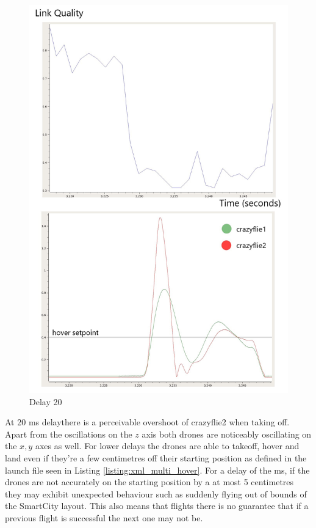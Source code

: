 \begin{figure}[H]
\centering
 \includegraphics[scale=0.35]{Figures/delay_20.jpg}
 \caption{Delay 20}
 \label{figure:rssi}
\end{figure}

\noindent At 20 ms delaythere is a perceivable overshoot of crazyflie2 when taking off. Apart from the oscillations on the $z$ axis both drones are noticeably oscillating on the $x,y$ axes as well. For lower delays the drones are able to takeoff, hover and land even if they're a few centimetres off their starting position as defined in the launch file seen in Listing \ref{listing:xml_multi_hover}. For a delay of the ms, if the drones are not accurately on the starting position by a at most 5 centimetres they may exhibit unexpected behaviour such as suddenly flying out of bounds of the SmartCity layout. This also means that flights there is no guarantee that if a previous flight is successful the next one may not be.

